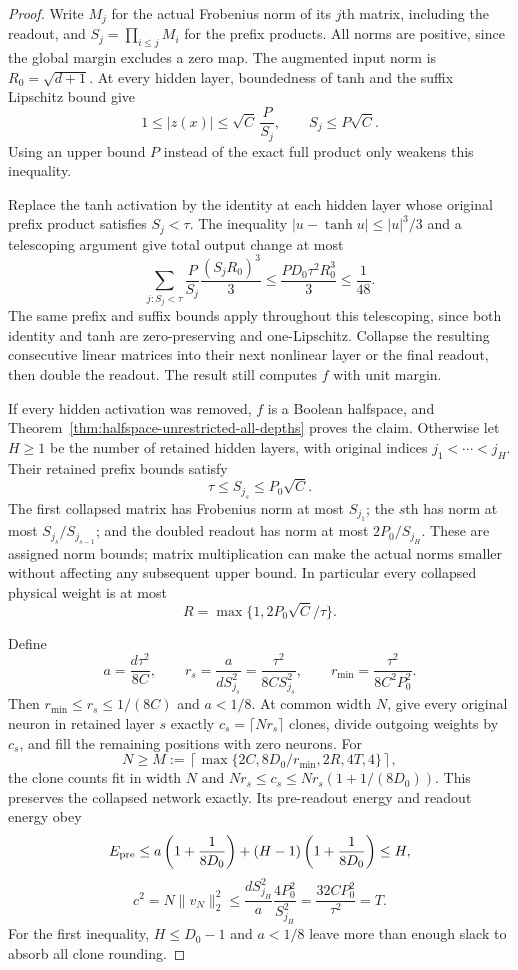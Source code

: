 \begin{proof}
Write $M_j$ for the actual Frobenius norm of its $j$th matrix, including
the readout, and $S_j=\prod_{i\le j}M_i$ for the prefix products.
All norms are positive, since the global margin excludes a zero map.
The augmented input norm is $R_0=\sqrt{d+1}$.
At every hidden layer, boundedness of tanh and the suffix Lipschitz
bound give
\[
 1\le |z(x)|\le\sqrt C\,\frac P{S_j},
 \qquad S_j\le P\sqrt C.
\]
Using an upper bound $P$ instead of the exact full product only weakens
this inequality.

Replace the tanh activation by the identity at each hidden layer whose
original prefix product satisfies $S_j<\tau$.
The inequality $|u-\tanh u|\le |u|^3/3$ and a telescoping argument give
total output change at most
\[
 \sum_{j:S_j<\tau}\frac{P}{S_j}
      \frac{(S_jR_0)^3}{3}
 \le\frac{PD_0\tau^2R_0^3}{3}\le\frac1{48}.
\]
The same prefix and suffix bounds apply throughout this telescoping,
since both identity and tanh are zero-preserving and one-Lipschitz.
Collapse the resulting consecutive linear matrices into their next
nonlinear layer or the final readout, then double the readout. The
result still computes $f$ with unit margin.

If every hidden activation was removed, $f$ is a Boolean halfspace,
and Theorem~\ref{thm:halfspace-unrestricted-all-depths} proves the claim.
Otherwise let $H\ge1$ be the number of retained hidden layers, with
original indices $j_1<\cdots<j_H$. Their retained prefix bounds satisfy
\[
 \tau\le S_{j_s}\le P_0\sqrt C.
\]
The first collapsed matrix has Frobenius norm at most $S_{j_1}$;
the $s$th has norm at most $S_{j_s}/S_{j_{s-1}}$; and the doubled
readout has norm at most $2P_0/S_{j_H}$. These are assigned norm bounds;
matrix multiplication can make the actual norms smaller without
affecting any subsequent upper bound. In particular every collapsed
physical weight is at most
\[
 R=\max\{1,2P_0\sqrt C/\tau\}.
\]

Define
\[
 a=\frac{d\tau^2}{8C},\qquad
 r_s=\frac{a}{dS_{j_s}^2}=\frac{\tau^2}{8C S_{j_s}^2},
 \qquad r_{\min}=\frac{\tau^2}{8C^2P_0^2}.
\]
Then $r_{\min}\le r_s\le1/(8C)$ and $a<1/8$.
At common width $N$, give every original neuron in retained layer $s$
exactly $c_s=\lceil Nr_s\rceil$ clones, divide outgoing weights by
$c_s$, and fill the remaining positions with zero neurons.
For
\[
 N\ge M:=\left\lceil\max\{2C,8D_0/r_{\min},2R,4T,4\}\right\rceil,
\]
the clone counts fit in width $N$ and
$Nr_s\le c_s\le Nr_s(1+1/(8D_0))$.
This preserves the collapsed network exactly. Its pre-readout energy
and readout energy obey
\[
 E_{\rm pre}\le a\left(1+\frac1{8D_0}\right)
 +(H-1)\left(1+\frac1{8D_0}\right)\le H,
\]
\[
 c^2=N\|v_N\|_2^2
 \le\frac{dS_{j_H}^2}{a}\frac{4P_0^2}{S_{j_H}^2}
 =\frac{32CP_0^2}{\tau^2}=T.
\]
For the first inequality, $H\le D_0-1$ and $a<1/8$ leave more than
enough slack to absorb all clone rounding.


\end{proof}
